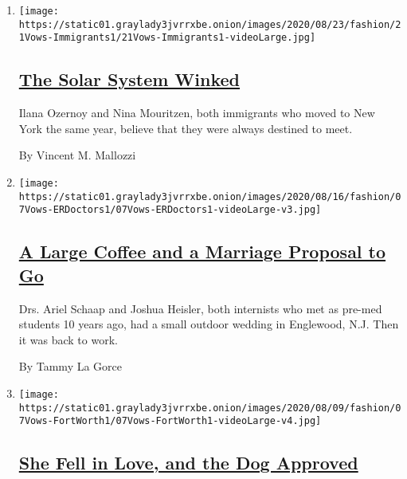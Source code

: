 \begin{enumerate}
\def\labelenumi{\arabic{enumi}.}
\item
  \texttt{[image: https://static01.graylady3jvrrxbe.onion/images/2020/08/23/fashion/21Vows-Immigrants1/21Vows-Immigrants1-videoLarge.jpg]}

  \hypertarget{the-solar-system-winked}{%
  \subsection{\texorpdfstring{\href{/2020/08/21/fashion/weddings/Planets-Aligned-for-Ilana-Ozernoy-and-Nina-Mouritzen.html}{The
  Solar System
  Winked}}{The Solar System Winked}}\label{the-solar-system-winked}}

  Ilana Ozernoy and Nina Mouritzen, both immigrants who moved to New
  York the same year, believe that they were always destined to meet.

  By Vincent M. Mallozzi
\item
  \texttt{[image: https://static01.graylady3jvrrxbe.onion/images/2020/08/16/fashion/07Vows-ERDoctors1/07Vows-ERDoctors1-videoLarge-v3.jpg]}

  \hypertarget{a-large-coffee-and-a-marriage-proposal-to-go}{%
  \subsection{\texorpdfstring{\href{/2020/08/14/style/a-large-coffee-and-a-marriage-proposal-to-go.html}{A
  Large Coffee and a Marriage Proposal to
  Go}}{A Large Coffee and a Marriage Proposal to Go}}\label{a-large-coffee-and-a-marriage-proposal-to-go}}

  Drs. Ariel Schaap and Joshua Heisler, both internists who met as
  pre-med students 10 years ago, had a small outdoor wedding in
  Englewood, N.J. Then it was back to work.

  By Tammy La Gorce
\item
  \texttt{[image: https://static01.graylady3jvrrxbe.onion/images/2020/08/09/fashion/07Vows-FortWorth1/07Vows-FortWorth1-videoLarge-v4.jpg]}

  \hypertarget{she-fell-in-love-and-the-dog-approved}{%
  \subsection{\texorpdfstring{\href{/2020/08/07/fashion/weddings/Tara-Harper-and-Fritz-Rahr-Fort-Worth-wedding.html}{She
  Fell in Love, and the Dog
  Approved}}{She Fell in Love, and the Dog Approved}}\label{she-fell-in-love-and-the-dog-approved}}


\end{enumerate}
